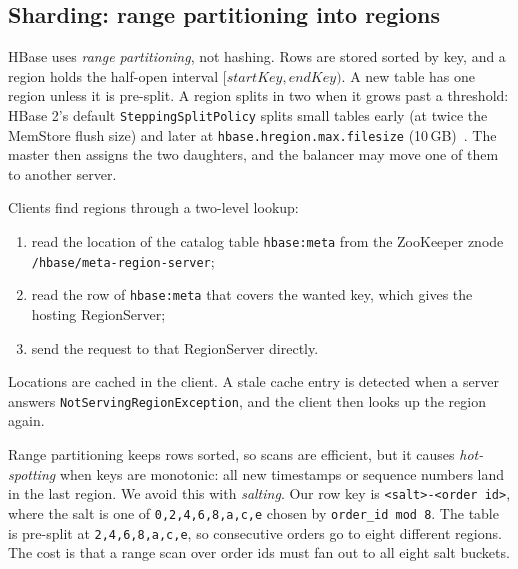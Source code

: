 \documentclass[10pt,twocolumn,letterpaper]{article}
\newcommand{\code}[1]{\texttt{\small #1}}
\begin{document}
\subsection{Sharding: range partitioning into regions}
HBase uses \emph{range partitioning}, not hashing. Rows are stored sorted by key, and a region holds the half-open interval $[\textit{startKey}, \textit{endKey})$. A new table has one region unless it is pre-split. A region splits in two when it grows past a threshold: HBase 2's default \code{SteppingSplitPolicy} splits small tables early (at twice the MemStore flush size) and later at \code{hbase.hregion.max.filesize} (10\,GB)~\cite{refguide}. The master then assigns the two daughters, and the balancer may move one of them to another server.

Clients find regions through a two-level lookup:
\begin{enumerate}
\item read the location of the catalog table \code{hbase:meta} from the ZooKeeper znode \code{/hbase/meta-region-server};
\item read the row of \code{hbase:meta} that covers the wanted key, which gives the hosting RegionServer;
\item send the request to that RegionServer directly.
\end{enumerate}
Locations are cached in the client. A stale cache entry is detected when a server answers \code{NotServingRegionException}, and the client then looks up the region again.

Range partitioning keeps rows sorted, so scans are efficient, but it causes \emph{hot-spotting} when keys are monotonic: all new timestamps or sequence numbers land in the last region. We avoid this with \emph{salting}. Our row key is \code{<salt>-<order id>}, where the salt is one of \code{0,2,4,6,8,a,c,e} chosen by \code{order\_id mod 8}. The table is pre-split at \code{2,4,6,8,a,c,e}, so consecutive orders go to eight different regions. The cost is that a range scan over order ids must fan out to all eight salt buckets.
\end{document}
